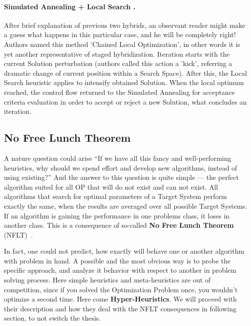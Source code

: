 \paragraph{Simulated Annealing + Local Search \cite{martin1996combining}.}
After brief explanation of previous two hybrids, an observant reader might make a guess what happens in this particular case, and he will be completely right!
Authors named this method 'Chained Local Optimization', in other words it is yet another representative of staged hybridization. Iteration starts with the current Solution perturbation (authors called this action a 'kick', referring a dramatic change of current position within a Search Space). After this, the Local Search heuristic applies to intensify obtained Solution. When the local optimum reached, the control flow returned to the Simulated Annealing for acceptance criteria evaluation in order to accept or reject a new Solution, what concludes an iteration.


\subsection{No Free Lunch Theorem}
A nature question could arise ``If we have all this fancy and well-performing heuristics, why should we spend effort and develop new algorithms, instead of using existing?'' And the answer to this question is quite simple — the perfect algorithm suited for all OP that will do not exist and can not exist. All algorithms that search for optimal parameters of a Target System perform exactly the same, when the results are averaged over all possible Target Systems. If an algorithm is gaining the performance in one problems class, it loses in another class. This is a consequence of so-called \textbf{No Free Lunch Theorem} (NFLT)~\cite{wolpert1997no}.

In fact, one could not predict, how exactly will behave one or another algorithm with problem in hand. A possible and the most obvious way is to probe the specific approach, and analyze it behavior with respect to another in problem solving process. Here simple heuristics and meta-heuristics are out of competition, since if you solved the Optimization Problem once, you wouldn't optimize a second time.
Here come \textbf{Hyper-Heuristics}. We will proceed with their description and how they deal with the NFLT consequences in following section, to not switch the thesis.


